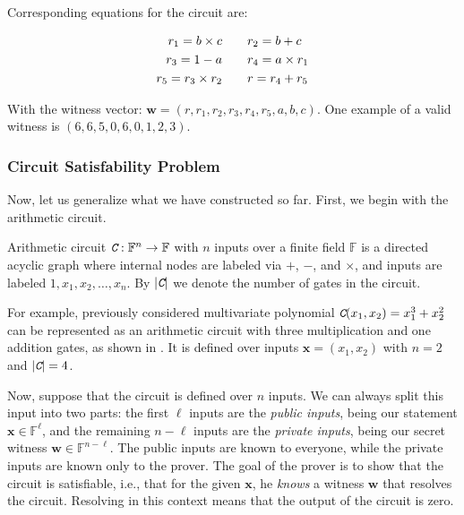 \documentclass[../lecture-notes.tex]{subfiles}
\begin{document}
Corresponding equations for the circuit are:

\begin{equation*}
    \begin{aligned}
        r_1 = b \times c \hspace{10px} & & &
        r_2 = b + c \\
        r_3 = 1 - a \hspace{10px} & & &
        r_4 = a \times r_1 \\
        r_5 = r_3 \times r_2 \hspace{10px} & & &
        r = r_4 + r_5 \\
    \end{aligned}
\end{equation*}

With the witness vector: $\mathbf{w} = (r, r_1, r_2, r_3, r_4, r_5, a , b, c)$. One example of a valid witness is $(6, 6, 5, 0, 6, 0, 1, 2, 3)$.

\subsubsection{Circuit Satisfability Problem}

Now, let us generalize what we have constructed so far. First, we begin with the arithmetic circuit.

\begin{definition}
    Arithmetic circuit $\textit{\texttt{C}}: \mathbb{F}^n \to \mathbb{F}$ with $n$ inputs over a finite field $\mathbb{F}$ is a directed acyclic graph where internal nodes are labeled via $+$, $-$, and $\times$, and inputs are labeled $1,x_1,x_2,\dots,x_n$. By $|\textit{\texttt{C}}|$ we denote the number of gates in the circuit.
\end{definition}

\begin{example}
    For example, previously considered multivariate polynomial $\textit{\texttt{C}}(x_1,x_2) = x_1^3 + x_2^2$ can be represented as an arithmetic circuit with three multiplication and one addition gates, as shown in . It is defined over inputs $\mathbf{x}=(x_1,x_2)$ with $n=2$ and $|\textit{\texttt{C}}| = 4$.
\end{example}

Now, suppose that the circuit is defined over $n$ inputs. We can always split this input into two parts: the first $\ell$ inputs are the \textit{public inputs}, being our statement $\mathbf{x} \in \mathbb{F}^{\ell}$, and the remaining $n-\ell$ inputs are the \textit{private inputs}, being our secret witness $\mathbf{w} \in \mathbb{F}^{n-\ell}$. The public inputs are known to everyone, while the private inputs are known only to the prover. The goal of the prover is to show that the circuit is satisfiable, i.e., that for the given $\mathbf{x}$, he \textit{knows} a witness $\mathbf{w}$ that resolves the circuit. Resolving in this context means that the output of the circuit is zero.
\end{document}
